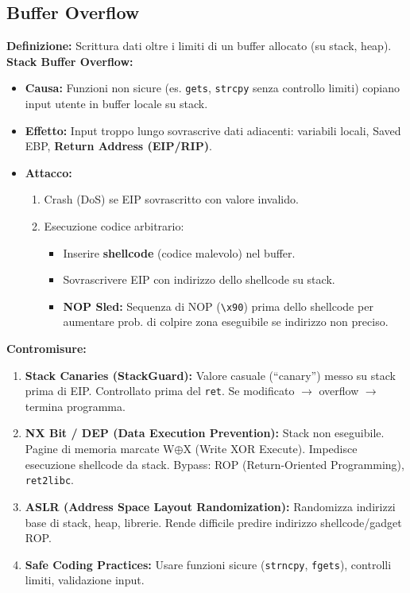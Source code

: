 \documentclass[10pt,a4paper]{article}
\begin{document}
\begin{multicols}{2}
\section*{Buffer Overflow}
\textbf{Definizione:} Scrittura dati oltre i limiti di un buffer allocato (su stack, heap).
\textbf{Stack Buffer Overflow:}
\begin{itemize}
    \item \textbf{Causa:} Funzioni non sicure (es. \texttt{gets}, \texttt{strcpy} senza controllo limiti) copiano input utente in buffer locale su stack.
    \item \textbf{Effetto:} Input troppo lungo sovrascrive dati adiacenti: variabili locali, Saved EBP, \textbf{Return Address (EIP/RIP)}.
    \item \textbf{Attacco:}
    \begin{enumerate}
        \item Crash (DoS) se EIP sovrascritto con valore invalido.
        \item Esecuzione codice arbitrario:
        \begin{itemize}
            \item Inserire \textbf{shellcode} (codice malevolo) nel buffer.
            \item Sovrascrivere EIP con indirizzo dello shellcode su stack.
            \item \textbf{NOP Sled:} Sequenza di NOP (\verb|\x90|) prima dello shellcode per aumentare prob. di colpire zona eseguibile se indirizzo non preciso.
        \end{itemize}
    \end{enumerate}
\end{itemize}
\textbf{Contromisure:}
\begin{enumerate}
    \item \textbf{Stack Canaries (StackGuard):} Valore casuale (``canary'') messo su stack prima di EIP. Controllato prima del \texttt{ret}. Se modificato $\rightarrow$ overflow $\rightarrow$ termina programma.
    \item \textbf{NX Bit / DEP (Data Execution Prevention):} Stack non eseguibile. Pagine di memoria marcate W$\oplus$X (Write XOR Execute). Impedisce esecuzione shellcode da stack.
    Bypass: ROP (Return-Oriented Programming), \texttt{ret2libc}.
    \item \textbf{ASLR (Address Space Layout Randomization):} Randomizza indirizzi base di stack, heap, librerie. Rende difficile predire indirizzo shellcode/gadget ROP.
    \item \textbf{Safe Coding Practices:} Usare funzioni sicure (\texttt{strncpy}, \texttt{fgets}), controlli limiti, validazione input.
\end{enumerate}


\end{multicols}
\end{document}
